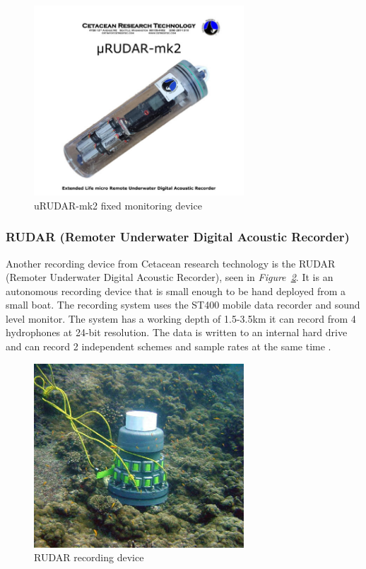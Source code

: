 \begin{figure}[h]
    \centering
    \includegraphics[width=0.70\textwidth]{graphics/uRUDAR-mk2.jpg}
    \caption{uRUDAR-mk2 fixed monitoring device\cite{computing_microrudar_nodate}}
    \label{fig:uRUDAR}
\end{figure}

\subsubsection{RUDAR (Remoter Underwater Digital Acoustic Recorder)}
Another recording device from Cetacean research technology is the RUDAR (Remoter Underwater Digital Acoustic Recorder), seen in \textit{Figure~\ref{fig:Rudar}}. 
It is an autonomous recording device that is small enough to be hand deployed from a small boat.
The recording system uses the ST400 mobile data recorder and sound level monitor. 
The system has a working depth of 1.5-3.5km it can record from 4 hydrophones at 24-bit resolution.
The data is written to an internal hard drive and can record 2 independent schemes and sample rates at the same time \cite{cetacean_research_technology_rudar_2021}.

\begin{figure}[h]
    \centering
    \includegraphics[width=0.70\textwidth]{graphics/Rudar.jpg}
    \caption{RUDAR recording device \cite{cetacean_research_technology_rudar_2021}}
    \label{fig:Rudar}
\end{figure}

